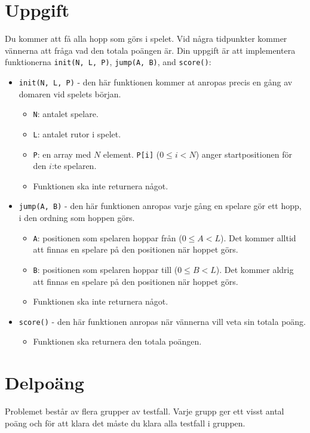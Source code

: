 \section*{Uppgift}
Du kommer att få alla hopp som görs i spelet. Vid några tidpunkter kommer vännerna att fråga vad den totala poängen är. Din uppgift är 
att implementera funktionerna \texttt{init(N, L, P)}, \texttt{jump(A, B)}, and \texttt{score()}:
\begin{itemize}
  \item \texttt{init(N, L, P)} - den här funktionen kommer at anropas precis en gång av domaren vid spelets början.
  \begin{itemize}
    \item \texttt{N}: antalet spelare.
    \item \texttt{L}: antalet rutor i spelet.
    \item \texttt{P}: en array med $N$ element. \texttt{P[i]} ($0 \le i < N$) anger startpositionen för den $i$:te spelaren.
    \item Funktionen ska inte returnera något.
  \end{itemize}

  \item \texttt{jump(A, B)} - den här funktionen anropas varje gång en spelare gör ett hopp, i den ordning som hoppen görs.
  \begin{itemize}
    \item \texttt{A}: positionen som spelaren hoppar från ($0 \le A < L$). Det kommer alltid att finnas en spelare på den positionen när hoppet görs.
    \item \texttt{B}: positionen som spelaren hoppar till ($0 \le B < L$). Det kommer aldrig att finnas en spelare på den positionen när hoppet görs.
    \item Funktionen ska inte returnera något.
  \end{itemize}

  \item \texttt{score()} - den här funktionen anropas när vännerna vill veta sin totala poäng.
  \begin{itemize}
    \item Funktionen ska returnera den totala poängen.
  \end{itemize}

\end{itemize}

\section*{Delpoäng}
Problemet består av flera grupper av testfall. Varje grupp ger ett visst antal poäng och för att klara det måste du klara alla testfall i gruppen.

